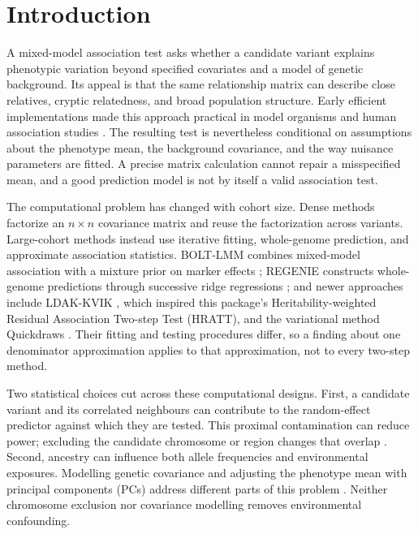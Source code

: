 \documentclass[11pt]{article}
\begin{document}
\section{Introduction}

A mixed-model association test asks whether a candidate variant explains
phenotypic variation beyond specified covariates and a model of genetic
background. Its appeal is that the same relationship matrix can describe
close relatives, cryptic relatedness, and broad population structure.
Early efficient implementations made this approach practical in model
organisms and human association studies
\citep{kang2008,kang2010,lippert2011,zhou2012}. The resulting test is
nevertheless conditional on assumptions about the phenotype mean, the
background covariance, and the way nuisance parameters are fitted. A
precise matrix calculation cannot repair a misspecified mean, and a
good prediction model is not by itself a valid association test.

The computational problem has changed with cohort size. Dense methods
factorize an $n\times n$ covariance matrix and reuse the factorization
across variants. Large-cohort methods instead use iterative fitting,
whole-genome prediction, and approximate association statistics.
BOLT-LMM combines mixed-model association with a mixture prior on marker
effects \citep{loh2015}; REGENIE constructs whole-genome predictions
through successive ridge regressions \citep{mbatchou2021}; and newer
approaches include LDAK-KVIK \citep{hof2025}, which inspired this
package's Heritability-weighted Residual Association Two-step Test (HRATT),
and the variational method Quickdraws \citep{loya2025}. Their fitting and
testing procedures differ, so a finding about one denominator approximation
applies to that approximation, not to every two-step method.

Two statistical choices cut across these computational designs. First,
a candidate variant and its correlated neighbours can contribute to the
random-effect predictor against which they are tested. This proximal
contamination can reduce power; excluding the candidate chromosome or
region changes that overlap \citep{listgarten2012,yang2014}. Second,
ancestry can influence both allele frequencies and environmental
exposures. Modelling genetic covariance and adjusting the phenotype mean
with principal components (PCs) address different parts of this problem
\citep{price2006,vilhjalmsson2013}. Neither chromosome exclusion nor
covariance modelling removes environmental confounding.
\end{document}
